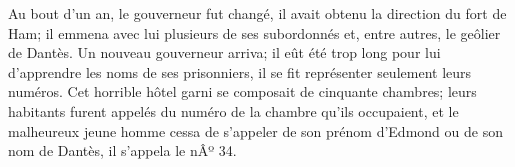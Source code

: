 Au bout d'un an, le gouverneur fut changé, il avait obtenu la direction du fort de Ham; il emmena avec lui plusieurs de ses subordonnés et, entre autres, le geôlier de Dantès. Un nouveau gouverneur arriva; il eût été trop long pour lui d'apprendre les noms de ses prisonniers, il se fit représenter seulement leurs numéros. Cet horrible hôtel garni se composait de cinquante chambres; leurs habitants furent appelés du numéro de la chambre qu'ils occupaient, et le malheureux jeune homme cessa de s'appeler de son prénom d'Edmond ou de son nom de Dantès, il s'appela le nÂº 34.



